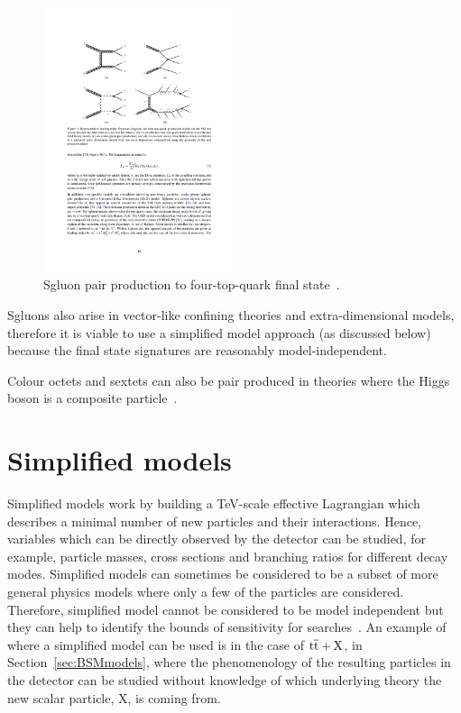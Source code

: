 \begin{figure}[ht!]
\begin{center}
    \includegraphics[width=0.49\textwidth]{images/Theory/sgluontotttt.pdf}
    \caption{Sgluon pair production to four-top-quark final state~\cite{Aad:2015kqa}.}
    \label{fig:sgluontttt}
\end{center}
\end{figure}

Sgluons also arise in vector-like confining theories and extra-dimensional models, therefore it is viable to use a simplified model approach (as discussed below) because the final state signatures are reasonably model-independent.

Colour octets and sextets can also be pair produced in theories where the Higgs boson is a composite particle~\cite{Cacciapaglia2015}.



\section{Simplified models}

Simplified models work by building a TeV-scale effective Lagrangian which describes a minimal number of new particles and their interactions. Hence, variables which can be directly observed by the detector can be studied, for example, particle masses, cross sections and branching ratios for different decay modes. Simplified models can sometimes be considered to be a subset of more general physics models where only a few of the particles are considered. Therefore, simplified model cannot be considered to be model independent but they can help to identify the bounds of sensitivity for searches~\cite{0954-3899-39-10-105005}. An example of where a simplified model can be used is in the case of $\mathrm{t}\overline{\mathrm{t}}+\textrm{X}$, in Section~\ref{sec:BSMmodels}, where the phenomenology of the resulting particles in the detector can be studied without knowledge of which underlying theory the new scalar particle, X, is coming from.


